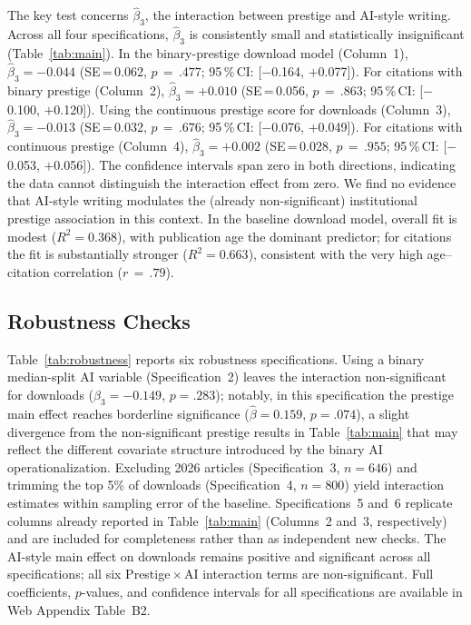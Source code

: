 \documentclass[12pt,a4paper]{article}
\begin{document}
The key test concerns $\hat{\beta}_3$, the interaction between prestige
and AI-style writing.
Across all four specifications, $\hat{\beta}_3$ is consistently small
and statistically insignificant (Table~\ref{tab:main}).
In the binary-prestige download model (Column~1),
$\hat{\beta}_3 = -0.044$ (SE\,=\,0.062, $p\,=\,.477$;
95\,\%\,CI: [$-$0.164, $+$0.077]).
For citations with binary prestige (Column~2),
$\hat{\beta}_3 = +0.010$ (SE\,=\,0.056, $p\,=\,.863$;
95\,\%\,CI: [$-$0.100, $+$0.120]).
Using the continuous prestige score for downloads (Column~3),
$\hat{\beta}_3 = -0.013$ (SE\,=\,0.032, $p\,=\,.676$;
95\,\%\,CI: [$-$0.076, $+$0.049]).
For citations with continuous prestige (Column~4),
$\hat{\beta}_3 = +0.002$ (SE\,=\,0.028, $p\,=\,.955$;
95\,\%\,CI: [$-$0.053, $+$0.056]).
The confidence intervals span zero in both directions,
indicating the data cannot distinguish the interaction effect from zero.
We find no evidence that AI-style writing modulates the (already
non-significant) institutional prestige association in this context.
In the baseline download model, overall fit is modest ($R^2 = 0.368$),
with publication age the dominant predictor; for citations the fit is
substantially stronger ($R^2 = 0.663$), consistent with the very high
age--citation correlation ($r\,=\,.79$).

\subsection{Robustness Checks}

Table~\ref{tab:robustness} reports six robustness specifications.
Using a binary median-split AI variable (Specification~2) leaves
the interaction non-significant for downloads
($\hat{\beta}_3 = -0.149$, $p=.283$); notably, in this specification
the prestige main effect reaches borderline significance
($\hat{\beta} = 0.159$, $p=.074$), a slight divergence from the
non-significant prestige results in Table~\ref{tab:main} that may
reflect the different covariate structure introduced by the binary AI
operationalization.
Excluding 2026 articles (Specification~3, $n = 646$) and trimming the
top 5\% of downloads (Specification~4, $n = 800$) yield interaction
estimates within sampling error of the baseline.
Specifications~5 and~6 replicate columns already reported in
Table~\ref{tab:main} (Columns~2 and~3, respectively) and are included
for completeness rather than as independent new checks.
The AI-style main effect on downloads remains positive and significant
across all specifications; all six Prestige\,$\times$\,AI interaction
terms are non-significant.
Full coefficients, $p$-values, and confidence intervals for all
specifications are available in Web Appendix Table~B2.
\end{document}
